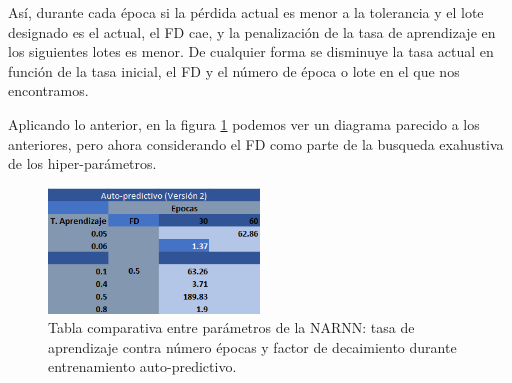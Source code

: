 Así, durante cada época si la pérdida actual es menor a la tolerancia y el lote designado es el actual, el FD cae, y la penalización de la tasa de aprendizaje en los siguientes lotes es menor. De cualquier forma se disminuye la tasa actual en función de la tasa inicial, el FD y el número de época o lote en el que nos encontramos.

Aplicando lo anterior, en la figura \ref{fig:lr_epocas_NARNN_autopred_v2} podemos ver un diagrama parecido a los anteriores, pero ahora considerando el FD como parte de la busqueda exahustiva de los hiper-parámetros.

\begin{figure}[H]
    \centering
    \includegraphics[width=0.5\textwidth]{Figuras/proceso_de_entrenamiento/lr_epocas_NARNN_auto_pred_v2.png}
    \caption{Tabla comparativa entre parámetros de la NARNN: tasa de aprendizaje contra número épocas y factor de decaimiento durante entrenamiento auto-predictivo.} 
    \label{fig:lr_epocas_NARNN_autopred_v2}
\end{figure}

